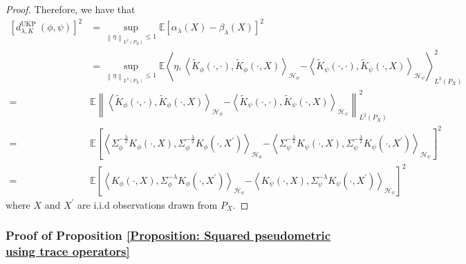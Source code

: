\documentclass{article}
\theoremstyle{plain}
\newcommand{\E}{\mathbb{E}}
\newcommand{\repone}{\phi}
\newcommand{\reptwo}{\psi}
\newcommand{\Hone}{\mathcal{H}_{\phi}}
\newcommand{\Htwo}{\mathcal{H}_{\psi}}
\newcommand{\norm}[1]{\left\|#1\right\|}
\newcommand{\inprod}[1]{\left \langle #1 \right\rangle}
\newcommand{\LPtwo}{L^{2}(P_{X})}
\newcommand{\metricstname}{UKP }
\begin{document}
\begin{proof}
Therefore, we have that
\[
\begin{aligned}
    \left[d_{\lambda,K}^{\text{\metricstname}}(\repone,\reptwo)\right]^{2}
    &= \underset{\norm{\eta}_{\LPtwo} \leq 1}{\sup} \E\left[\alpha_{\lambda}(X)-\beta_{\lambda}(X)\right]^{2}\\
    &= \underset{\norm{\eta}_{\LPtwo} \leq 1}{\sup} \E\left\langle\eta, \inprod{\widetilde{K}_{\repone}(\cdot,\cdot),\widetilde{K}_{\repone}(\cdot,X)}_{\Hone} \right.\left.-\inprod{\widetilde{K}_{\reptwo}(\cdot,\cdot),\widetilde{K}_{\reptwo}(\cdot,X)}_{\Htwo}\right\rangle_{\LPtwo}^{2}\\
    =& \E \left\|\inprod{\widetilde{K}_{\repone}(\cdot,\cdot),\widetilde{K}_{\repone}(\cdot,X)}_{\Hone} \right.\left.-\inprod{\widetilde{K}_{\reptwo}(\cdot,\cdot),\widetilde{K}_{\reptwo}(\cdot,X)}_{\Htwo}\right\|_{\LPtwo}^{2}\\
    =& \E  \left[\inprod{\Sigma_{\repone}^{-\frac{\lambda}{2}}K_{\repone}(\cdot,X),\Sigma_{\repone}^{-\frac{\lambda}{2}}K_{\repone}(\cdot,X^{\prime})}_{\Hone} \right.  \left.-\inprod{\Sigma_{\reptwo}^{-\frac{\lambda}{2}}K_{\reptwo}(\cdot,X),\Sigma_{\reptwo}^{-\frac{\lambda}{2}}K_{\reptwo}(\cdot,X^{\prime})}_{\Htwo}\right]^{2}\\
   = & \E  \left[\inprod{K_{\repone}(\cdot,X),\Sigma_{\repone}^{-\lambda}K_{\repone}(\cdot,X^{\prime})}_{\Hone} \right.  \left.-\inprod{K_{\reptwo}(\cdot,X),\Sigma_{\reptwo}^{-\lambda}K_{\reptwo}(\cdot,X^{\prime})}_{\Htwo}\right]^{2}
\end{aligned}
\]
where $X$ and $X^{\prime}$ are i.i.d observations drawn from $P_{X}$.
\end{proof}

\subsubsection{Proof of Proposition \ref{Proposition: Squared pseudometric using trace operators}}\label{Proof of Proposition 1}
\end{document}
